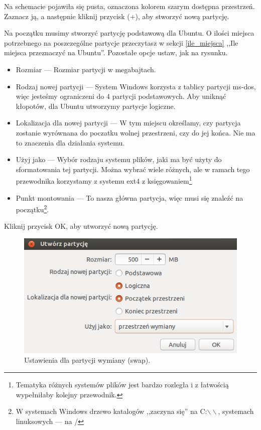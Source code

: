 Na schemacie pojawiła się pusta, oznaczona kolorem szarym \textcolor{ubuntu_orange}{dostępna przestrzeń}. Zaznacz ją, a następnie kliknij przycisk (\textcolor{ubuntu_orange}{+}), aby stworzyć nową partycję.

Na początku musimy stworzyć partycję podstawową dla Ubuntu. O ilości miejsca potrzebnego na poszczególne partycje przeczytasz w sekcji \ref{ile_miejsca} ,,Ile miejsca przeznaczyć na Ubuntu''. Pozostałe opcje ustaw, jak na rysunku.
\begin{itemize}
\item \textcolor{ubuntu_orange}{Rozmiar} --- Rozmiar partycji w megabajtach.
\item \textcolor{ubuntu_orange}{Rodzaj nowej partycji} --- System Windows korzysta z tablicy partycji ms-dos, więc jesteśmy ograniczeni do 4 partycji podstawowych. Aby uniknąć kłopotów, dla Ubuntu utworzymy partycje logiczne.
\item \textcolor{ubuntu_orange}{Lokalizacja dla nowej partycji} --- W tym miejscu określamy, czy partycja zostanie wyrównana do poczatku wolnej przestrzeni, czy do jej końca. Nie ma to znaczenia dla działania systemu.
\item \textcolor{ubuntu_orange}{Użyj jako} --- Wybór rodzaju systemu plików, jaki ma być użyty do sformatowania tej partycji. Można wybrać wiele różnych, ale w ramach tego przewodnika korzystamy z systemu ext4 z księgowaniem\footnote{Tematyka różnych systemów plików jest bardzo rozległa i z łatwością wypełniłaby kolejny przewodnik.}
\item \textcolor{ubuntu_orange}{Punkt montowania} --- To nasza główna partycja, więc musi się znaleźć na początku\footnote{W systemach Windows drzewo katalogów ,,zaczyna się'' na C:$\backslash\backslash$,  systemach linuksowych --- na /}.
\end{itemize}
Kliknij przycisk \textcolor{ubuntu_orange}{OK}, aby utworzyć nową partycję.
\clearpage
\begin{figure}
	\includegraphics[width=\linewidth]{images/instalator_partycjonowanie_gparted_dodaj_swap.png}
	\caption*{Ustawienia dla partycji wymiany (swap).}
\end{figure}

